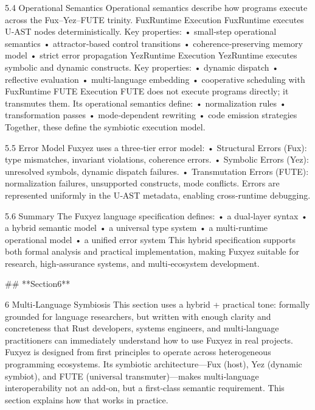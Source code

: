 5.4 Operational Semantics
Operational semantics describe how programs execute across the Fux–Yez–FUTE trinity.
FuxRuntime Execution
FuxRuntime executes U‑AST nodes deterministically.
Key properties:
• 	small‑step operational semantics
• 	attractor‑based control transitions
• 	coherence‑preserving memory model
• 	strict error propagation
YezRuntime Execution
YezRuntime executes symbolic and dynamic constructs.
Key properties:
• 	dynamic dispatch
• 	reflective evaluation
• 	multi‑language embedding
• 	cooperative scheduling with FuxRuntime
FUTE Execution
FUTE does not execute programs directly; it transmutes them.
Its operational semantics define:
• 	normalization rules
• 	transformation passes
• 	mode‑dependent rewriting
• 	code emission strategies
Together, these define the symbiotic execution model.

5.5 Error Model
Fuxyez uses a three‑tier error model:
• 	Structural Errors (Fux): type mismatches, invariant violations, coherence errors.
• 	Symbolic Errors (Yez): unresolved symbols, dynamic dispatch failures.
• 	Transmutation Errors (FUTE): normalization failures, unsupported constructs, mode conflicts.
Errors are represented uniformly in the U‑AST metadata, enabling cross‑runtime debugging.

5.6 Summary
The Fuxyez language specification defines:
• 	a dual‑layer syntax
• 	a hybrid semantic model
• 	a universal type system
• 	a multi‑runtime operational model
• 	a unified error system
This hybrid specification supports both formal analysis and practical implementation, making Fuxyez suitable for research, high‑assurance systems, and multi‑ecosystem development.

## **Section6**

6 Multi‑Language Symbiosis
This section uses a hybrid + practical tone: formally grounded for language researchers, but written with enough clarity and concreteness that Rust developers, systems engineers, and multi‑language practitioners can immediately understand how to use Fuxyez in real projects.
Fuxyez is designed from first principles to operate across heterogeneous programming ecosystems. Its symbiotic architecture—Fux (host), Yez (dynamic symbiot), and FUTE (universal transmuter)—makes multi‑language interoperability not an add‑on, but a first‑class semantic requirement. This section explains how that works in practice.


